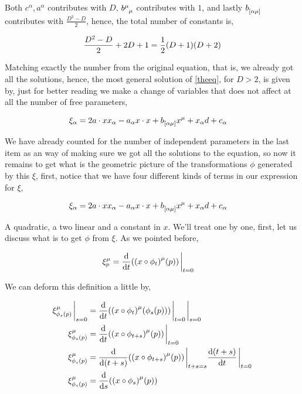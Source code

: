 Both $c^\alpha,a^\alpha$ contributes with $D$, $\tensor{b}{^\mu_\mu}$ contributes with $1$, and lastly $\tensor{b}{_{[\alpha}_{\mu]}}$ contributes with $\frac{D^2-D}{2}$, hence, the total number of constants is,

\begin{align*}
    \frac{D^2-D}{2}+2D+1=\frac12\qty(D+1)\qty(D+2)
\end{align*}

Matching exactly the number from the original equation, that is, we already got all the solutions, hence, the most general solution of \ref{theeq}, for $D>2$, is given by, just for better reading we make a change of variables that does not 
affect at all the number of free parameters,

\begin{align*}
    \xi_\alpha&=2a\cdot x x_\alpha-a_\alpha x\cdot x+\tensor{b}{_{[\alpha}_{\mu]}}x^\mu+x_\alpha d+c_\alpha
\end{align*}

\probitem{}

We have already counted for the number of independent parameters in the last item as an way of making sure we got all the solutions to the equation, so 
now it remains to get what is the geometric picture of the transformations $\phi$ generated by this $\xi$, first, notice that we have four different kinds of terms 
in our expression for $\xi$,

\begin{align*}
    \xi_\alpha&=2a\cdot x x_\alpha-a_\alpha x\cdot x+\tensor{b}{_{[\alpha}_{\mu]}}x^\mu+x_\alpha d+c_\alpha
\end{align*}

A quadratic, a two linear and a constant in $x$. We'll treat one by one, first, let us discuss what is to get $\phi$ from $\xi$. As we pointed before, 

\begin{align*}
    \xi_p^\mu&=\dv{}{t}\qty(\qty(x\circ\phi_t)^\mu(p))\eval_{t=0}
\end{align*}

We can deform this definition a little by,

\begin{align*}
    \xi_{\phi_s\qty(p)}^\mu\eval_{s=0}&=\dv{}{t}\qty(\qty(x\circ\phi_t)^\mu(\phi_s\qty(p)))\eval_{t=0}\eval_{s=0}\\
    \xi_{\phi_s\qty(p)}^\mu&=\dv{}{t}\qty(\qty(x\circ\phi_{t+s})^\mu(p))\eval_{t=0}\\
    \xi_{\phi_s\qty(p)}^\mu&=\dv{}{\qty(t+s)}\qty(\qty(x\circ\phi_{t+s})^\mu(p))\eval_{t+s=s}\dv{\qty(t+s)}{t}\eval_{t=0}\\
    \xi_{\phi_s\qty(p)}^\mu&=\dv{}{s}\qty(\qty(x\circ\phi_{s})^\mu(p))
\end{align*}

